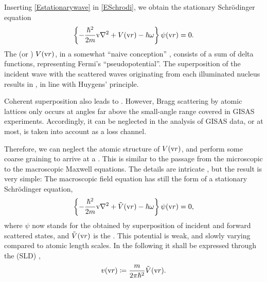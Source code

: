 Inserting \cref{Estationarywave} in \cref{ESchrodi},
we obtain the stationary Schrödinger equation
\begin{equation}\label{EstatSchrodi}
  \left\{-\frac{\hbar^2}{2m}\text{v}{\nabla}^2+V(\text{v}{r})-\hbar\omega\right\} \psi(\text{v}{r}) = 0.
\end{equation}
%
%
%
%
The  (or )
 $V(\text{v}{r})$,
in a somewhat ``naive conception'' \cite[p.~7]{Sea89},
consists of a sum of delta functions,
representing Fermi's ``pseudopotential''.
%
The superposition of the incident wave with the scattered waves
originating from each illuminated nucleus
results in ,
%
in line with Huygens' principle.
%

Coherent superposition also leads to .
%
However, Bragg scattering by atomic lattices only occurs at angles
far above the small-angle range covered in GISAS experiments.
Accordingly, it can be neglected in the analysis of GISAS data,
or at most, is taken into account as a loss channel.

Therefore,
we can neglect the atomic structure of $V(\text{v}{r})$,
and perform some coarse graining to
arrive at a .
%
This is
similar to the passage from
the microscopic to the macroscopic Maxwell equations.
The details are intricate \cite{Sea89,Lax51},
but the result \cite[eq.~2.8.32]{Sea89} is very simple:
The macroscopic field equation
has still the form of a stationary Schrödinger equation,
%
\begin{equation}\label{EmacrSchrodi}
  \left\{-\frac{\hbar^2}{2m}\text{v}{\nabla}^2+\tilde{V}(\text{v}{r})-\hbar\omega\right\} \psi(\text{v}{r}) = 0,
\end{equation}
%
%
where $\psi$ now stands for the 
%
%
obtained by superposition of
incident and forward scattered states,
and $\tilde{V}(\text{v}{r})$ is the .
%
This potential is weak, and slowly varying compared to atomic length scales.
In the following it shall be expressed through the
 (SLD)
%
%
%
\cite[eq.\ 2.8.37]{Sea89},
%
\begin{equation}
  v(\text{v}{r})\coloneqq\frac{m}{2\pi \hbar^2}\tilde{V}(\text{v}{r}).
\end{equation}

